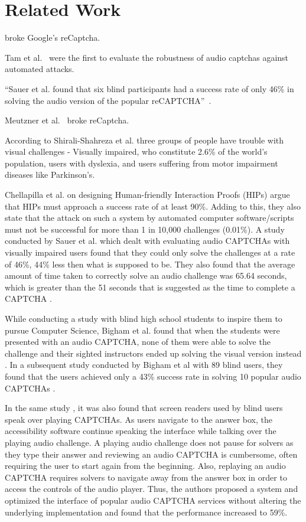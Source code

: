 \section{Related Work}
\label{sec:related}

\cite{sivakorn:eurosp16} broke Google's reCaptcha.

Tam et al.~\cite{tam2008improving} were the first to evaluate the robustness of audio captchas against automated attacks.

``Sauer et al. found that
six blind participants had a success rate of only 46\% in
solving the audio version of the popular reCAPTCHA''~\cite{sauer2008towards}.

Meutzner et al.~\cite{meutzner2014using} broke reCaptcha.

According to Shirali-Shahreza et al. \cite{shirali2011accessibility} three groups of people
have trouble with visual challenges - Visually impaired, who constitute 2.6\% of the world's
population, users with dyslexia, and users suffering from motor impairment diseases like Parkinson's.

Chellapilla et al. \cite{Chellapilla} on designing Human-friendly Interaction Proofs (HIPs)
argue that HIPs must approach a success rate of at least 90\%. Adding to this, they also state that the
attack on such a system by automated computer software/scripts must not be successful for more than 1 in
10,000 challenges (0.01\%). A study conducted by Sauer et al. \cite{sauer2008towards} which dealt with
evaluating audio CAPTCHAs with visually impaired users found that they could only solve the challenges
at a rate of 46\%, 44\% less then what is supposed to be. They also found that the average amount of time
taken to correctly solve an audio challenge was 65.64 seconds, which is greater than the 51 seconds that
is suggested as the time to complete a CAPTCHA \cite{schluessler2007bot}.

While conducting a study with blind high school students to inspire them to pursue Computer Science, Bigham et al.
found that when the students were presented with an audio CAPTCHA, none of them were able to solve the challenge and
their sighted instructors ended up solving the visual version instead \cite{bigham2008inspiring}. In a subsequent
study conducted by Bigham et al with 89 blind users, they found that the users achieved only a 43\% success rate in
solving 10 popular audio CAPTCHAs \cite{bigham2009evaluating}. 

In the same study \cite{bigham2009evaluating}, it was also found that screen readers used by blind users speak over
playing CAPTCHAs. As users navigate to the answer box, the accessibility software continue speaking the interface while
talking over the playing audio challenge. A playing audio challenge does not pause for solvers as they type their answer
and reviewing an audio CAPTCHA is cumbersome, often requiring the user to start again from the beginning. Also, replaying
an audio CAPTCHA requires solvers to navigate away from the answer box in order to access the controls of the audio player.
Thus, the authors proposed a system and optimized the interface of popular audio CAPTCHA services without altering the
underlying implementation and found that the performance increased to 59\%. 
